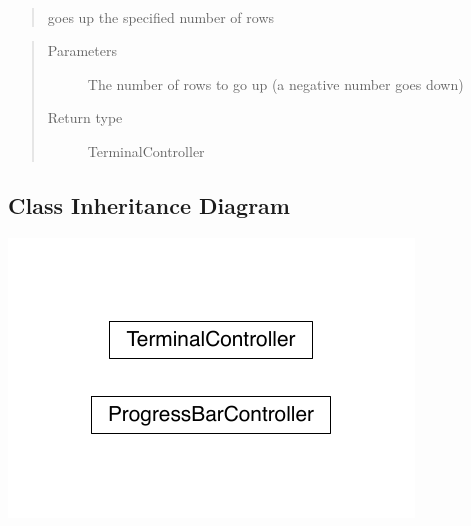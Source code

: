 \documentclass[a4paper,10pt,english]{sphinxmanual}
\begin{document}
\begin{fulllineitems}
\begin{fulllineitems}
\begin{quote}
\begin{description}
\end{description}\end{quote}

\end{fulllineitems}


\begin{fulllineitems}
\label{\detokenize{api/termtools.terminal.TerminalController:termtools.terminal.TerminalController.up}}~\begin{quote}

goes up the specified number of rows
\end{quote}
\begin{quote}\begin{description}
\item[{Parameters}] \leavevmode
{} \textendash{} The number of rows to go up (a negative number goes down)

\item[{Return type}] \leavevmode
TerminalController

\end{description}\end{quote}

\end{fulllineitems}


\end{fulllineitems}



\subsection{Class Inheritance Diagram}
\label{\detokenize{references:class-inheritance-diagram}}
\includegraphics{inheritance-4e77634e702cb303b37f325de087d3f5b165b913.pdf}
\end{document}
